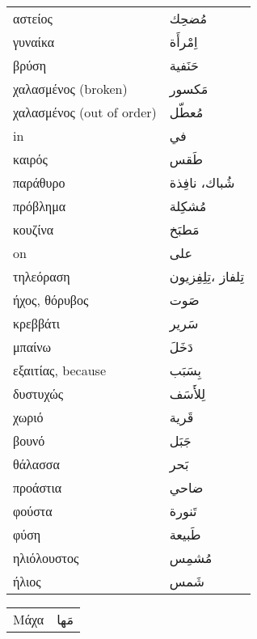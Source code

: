 \documentclass[twocolumn,a4paper]{article}
\newcommand{\ar}[1]{\textarabic{#1}}
\begin{document}
\begin{mpsupertabular}{ P{0.5\textwidth} P{0.5\textwidth} }
αστείος              & \ar{ مُضحِك } \\
γυναίκα              & \ar{ اِمْرأَة } \\
βρύση                & \ar{ حَنَفية } \\
χαλασμένος (broken)  & \ar{ مَكسور } \\
χαλασμένος (out of order)  & \ar{ مُعطّل } \\
in                   & \ar{ في } \\
καιρός               & \ar{ طَقس } \\
παράθυρο             & \ar{ شُباك، نافِذة } \\
πρόβλημα             & \ar{ مُشكِلة } \\
κουζίνα              & \ar{ مَطبَخ } \\
on                   & \ar{ على } \\
τηλεόραση            & \ar{  تِلفاز ،تِلِفِزيون } \\
ήχος, θόρυβος        & \ar{ صَوت } \\
κρεββάτι             & \ar{ سَرير } \\
μπαίνω               & \ar{ دَخَلَ } \\
εξαιτίας, because    & \ar{ بِسَبَب } \\
δυστυχώς             & \ar{ لِلأَسَف } \\
χωριό                & \ar{ قَرية } \\
βουνό                & \ar{ جَبَل } \\
θάλασσα              & \ar{ بَحر } \\
προάστια             & \ar{ ضاحي } \\
φούστα               & \ar{ تَنورة } \\
φύση                 & \ar{ طَبيعة } \\
ηλιόλουστος          & \ar{ مُشمِس } \\
ήλιος                & \ar{ شَمس } \\

\end{mpsupertabular}
\clearpage

\begin{mpsupertabular}{ P{0.5\textwidth} P{0.5\textwidth} }
Μάχα               & \ar{ مَها } \\
\end{mpsupertabular}

\clearpage
\end{document}
